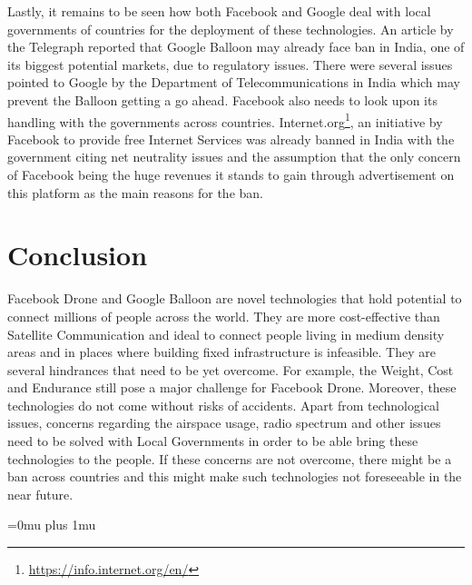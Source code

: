 \documentclass{llncs}
\begin{document}
                Lastly, it remains to be seen how both Facebook and Google deal with local governments of countries 
                for the deployment of these technologies. An article by the Telegraph \cite{balloon_ban} reported that Google 
                Balloon may already face ban in India, one of its biggest potential markets, due to regulatory issues. 
                There were several issues pointed to Google by the Department of Telecommunications in India which 
                may prevent the Balloon getting a go ahead.
                Facebook also needs to look upon its handling with the governments across countries. Internet.org\footnote{\url{https://info.internet.org/en/}}, 
                an initiative by Facebook to provide free Internet Services was already banned in India\cite{internetorg_ban} with the 
                government citing net neutrality issues and the assumption that the only concern of Facebook being the huge revenues
                it stands to gain through advertisement on this platform as the main reasons for the ban.
               
	 \section{Conclusion}
	 Facebook Drone and Google Balloon are novel technologies that hold potential to connect millions
	 of people across the world. They are more cost-effective than Satellite Communication and ideal to 
	 connect people living in medium density areas and in places where building fixed infrastructure
	 is infeasible. They are several hindrances that need to be yet overcome. For example, the Weight, Cost 
	 and Endurance still pose a major challenge for Facebook Drone. Moreover, these technologies do not 
	 come without risks of accidents. Apart from technological issues, concerns regarding the airspace 
	 usage, radio spectrum and other issues need to be solved with Local Governments in order to 
	 be able bring these technologies to the people. If these concerns are not overcome, there might
	 be a ban across countries and this might make such technologies not foreseeable in the near future.   

\Urlmuskip=0mu plus 1mu\relax


	
\end{document}
